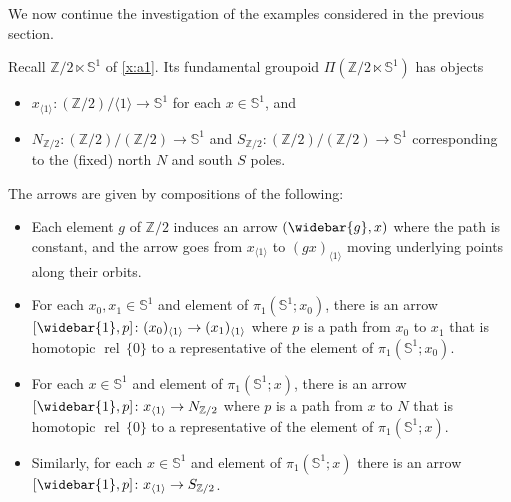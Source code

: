 \documentclass[12pt,reqno]{amsart}
\newcommand{\printname}[1]{}
\renewcommand{\printname}[1]
	{{\color{brown}{\makebox[0pt]{\hspace{-1in}\raisebox{8pt}{\tiny #1}}}}}
\newcommand{\labell}[1]{\label{#1} \printname{#1}}
\renewcommand{\SS}{{\mathbb{S}}} %
\newcommand{\ZZ}{{\mathbb{Z}}}  %
\newcommand{\rel}{{\operatorname{rel}}} %
\theoremstyle{plain}
\theoremstyle{definition}
\newenvironment{example}
		{\pushQED{\qed}\renewcommand{\qedsymbol}{$/\!\!/$}\examplex}
		{\popQED\endexamplex}
\begin{document}
    We now continue the investigation of the examples considered in the previous section.

    \begin{example}[{\bf Groupoid A}]\labell{x:a2}
        Recall $\ZZ/2\ltimes\SS^1$ of  \cref{x:a1}.   Its fundamental groupoid $\Pi(\ZZ/2\ltimes\SS^1)$ has objects 
        \begin{itemize}
            \item $x_{\langle 1\rangle}\colon(\ZZ/2)/\langle 1\rangle\to\SS^1$ for each $x\in\SS^1$, and
            \item $N_{\ZZ/2}\colon(\ZZ/2)/(\ZZ/2)\to\SS^1$ and $S_{\ZZ/2}\colon(\ZZ/2)/(\ZZ/2)\to\SS^1$ corresponding to the (fixed) north $N$ and south $S$ poles.
        \end{itemize}
        The arrows are given by compositions of the following: 
        \begin{itemize}
            \item Each element $g$ of $\ZZ/2$ induces an arrow  $(\widebar{g}, x)$ where the path is constant, and the arrow goes from $x_{\langle 1\rangle}$ to $(gx)_{\langle 1\rangle}$ moving underlying points along their orbits.
            \item For each $x_0,x_1\in\SS^1$ and element of $\pi_1(\SS^1;x_0)$, there is an arrow $[\widebar{1},p]\colon(x_0)_{\langle 1\rangle}\to(x_1)_{\langle 1\rangle}$ where $p$ is a path from $x_0$ to $x_1$ that is homotopic $\rel\,\{0\}$ to a representative of the element of $\pi_1(\SS^1;x_0)$.
            \item For each $x\in\SS^1$ and element of $\pi_1(\SS^1;x)$, there is an arrow $[\widebar{1},p]\colon x_{\langle 1\rangle}\to N_{\ZZ/2}$ where $p$ is a path from $x$ to $N$ that is homotopic $\rel\,\{0\}$ to a representative of the  element of $\pi_1(\SS^1;x)$.
            \item Similarly, for each $x\in\SS^1$ and element of $\pi_1(\SS^1;x)$ there is an arrow $[\widebar{1},p]\colon x_{\langle 1\rangle}\to S_{\ZZ/2}$.\qedhere
        \end{itemize}
    \end{example} 
\end{document}
